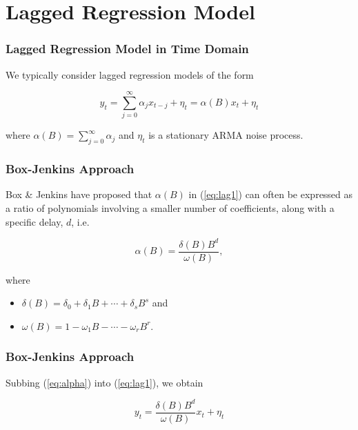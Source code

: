 \documentclass[%
xcolor=pdftex]{beamer}
\begin{document}
\section{Lagged Regression Model}
\frame{\tableofcontents[currentsection]}

\begin{frame}
\frametitle{Lagged Regression Model in Time Domain}

We typically consider lagged regression models of the form

\begin{equation} \label{eq:lag1}
y_t = \sum_{j=0}^\infty \alpha_j x_{t-j} + \eta_t = \alpha(B) x_t + \eta_t
\end{equation}

where $\alpha(B) = \sum_{j=0}^\infty \alpha_j$ and $\eta_t$ is a stationary ARMA noise process. 



\end{frame}





\begin{frame}
\frametitle{Box-Jenkins Approach}

Box \& Jenkins have proposed that $\alpha(B)$ in (\ref{eq:lag1}) can often be expressed as a ratio of polynomials involving a smaller number of coefficients, along with a specific delay, $d$, i.e.

\begin{equation} \label{eq:alpha}
\alpha(B) = \frac{\delta(B) B^d}{\omega(B)},
\end{equation}

where 

\begin{itemize}

\item $\delta(B) = \delta_0 + \delta_1 B + \cdots + \delta_s B^s$ and
\item $\omega(B) = 1 - \omega_1 B - \cdots - \omega_r B^r$.

\end{itemize}

\end{frame}

\begin{frame}
\frametitle{Box-Jenkins Approach}

Subbing (\ref{eq:alpha}) into (\ref{eq:lag1}), we obtain

\begin{equation} \label{eq:lag2}
y_t = \frac{\delta(B) B^d}{\omega(B)} x_t + \eta_t
\end{equation}


\end{frame}
\end{document}
